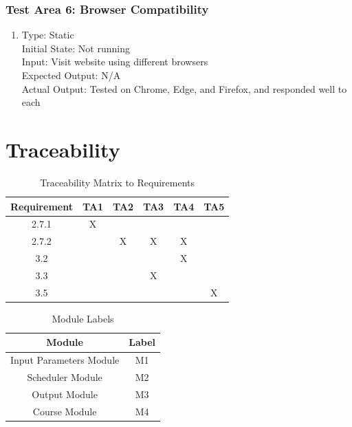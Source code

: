 \documentclass[11pt, oneside]{article}
\begin{document}
\subsubsection{Test Area 6: Browser Compatibility}
\begin{enumerate}
\item Type: Static \\
Initial State: Not running \\
Input: Visit website using different browsers\\
Expected Output: N/A \\
Actual Output: Tested on Chrome, Edge, and Firefox, and responded well to each

\end{enumerate}

\newpage
\section{Traceability}
\begin{table}[h]
\begin{center}
\begin{tabular}{ | c | c | c | c | c | c | }
\hline
 Requirement & TA1 & TA2 & TA3 & TA4 & TA5  \\ 
\hline
 2.7.1 & X & & & &   \\  
\hline
 2.7.2 & & X & X & X & \\
\hline 
 3.2 & & & & X & \\ 
\hline
 3.3 & & & X & & \\
\hline
 3.5 & & & & & X \\
\hline
\end{tabular}
\end{center}
\caption{Traceability Matrix to Requirements}
\end{table}

\begin{table}[H]
\begin{center}
\begin{tabular}{|c|c|}
\hline
Module & Label \\
\hline
Input Parameters Module & M1\\
\hline
Scheduler Module & M2\\
\hline
Output Module & M3\\
\hline
Course Module & M4\\
\hline
\end{tabular}
\end{center}
\label{default}
\caption{Module Labels}
\end{table}
\end{document}
